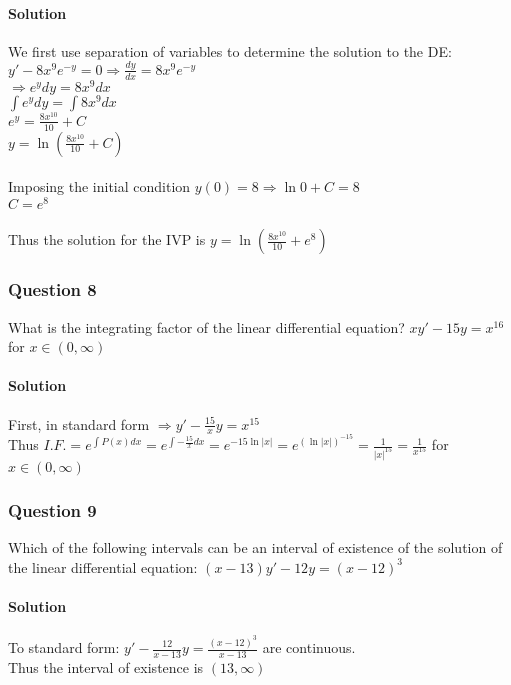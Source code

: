 \documentclass{article}
\begin{document}
\paragraph{Solution}
We first use separation of variables to determine the solution to the DE:
\\$y'-8x^9e^{-y}=0\Rightarrow \frac{dy}{dx}=8x^9e^{-y}$
\\$\Rightarrow e^ydy=8x^9dx$
\\$\int e^ydy=\int8x^9dx$
\\$e^y=\frac{8x^{10}}{10}+C$
\\$y=\ln{\left(\frac{8x^{10}}{10}+C\right)}$
\\\\Imposing the initial condition $y(0)=8\Rightarrow \ln{0+C}=8$
\\$C=e^8$
\\\\Thus the solution for the IVP is $y=\ln\left(\frac{8x^{10}}{10}+e^8\right)$

\subsubsection{Question 8}
What is the integrating factor of the linear differential equation? $xy'-15y=x^{16}$ for $x\in(0,\infty)$

\paragraph{Solution}
First, in standard form $\Rightarrow y'-\frac{15}{x}y=x^{15}$
\\Thus $I.F.=e^{\int P(x)dx}=e^{\int -\frac{15}{x}dx}=e^{-15\ln|x|}=e^{(\ln|x|)^{-15}}=\frac{1}{|x|^{15}}=\frac{1}{x^{15}}$ for $x\in(0,\infty)$
   
\subsubsection{Question 9}
Which of the following intervals can be an interval of existence of the solution of the linear differential equation:
$(x-13)y'-12y=(x-12)^3$

\paragraph{Solution}
To standard form: $y'-\frac{12}{x-13}y=\frac{(x-12)^3}{x-13}$ are continuous.
\\Thus the interval of existence is $(13,\infty)$
\end{document}
